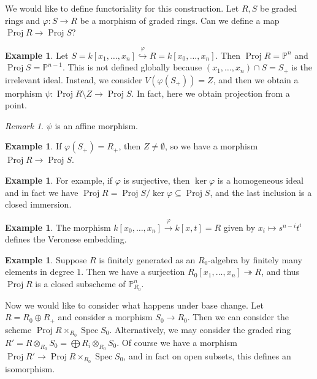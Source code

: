 \documentclass[leqno, openany]{memoir}
\theoremstyle{definition}
\newtheorem{exm}[thm]{Example}
\theoremstyle{remark}
\newtheorem{rmk}[thm]{Remark}
\theoremstyle{plain}
\theoremstyle{definition}
\theoremstyle{remark}
\renewcommand{\P}{\mathbb{P}}
\DeclareMathOperator{\Spec}{Spec}
\DeclareMathOperator{\Proj}{Proj}
\begin{document}
We would like to define functoriality for this construction. Let $R, S$ be
graded rings and $\varphi \colon S \to R$ be a morphism of graded rings. Can we
define a map $\Proj R \to \Proj S$?

\begin{exm} Let $S = k[x_1, \ldots, x_n] \overset{\varphi}{ \hookrightarrow } R
    = k[x_0, \ldots, x_n]$. Then $\Proj R = \P^n$ and $\Proj S = \P^{n-1}$.
    This is not defined globally because $(x_1, \ldots, x_n) \cap S = S_+$ is
    the irrelevant ideal. Instead, we consider $V(\varphi(S_+)) = Z$, and then
    we obtain a morphism $\psi \colon \Proj R \setminus Z \to \Proj S$. In
    fact, here we obtain projection from a point.  \end{exm}

\begin{rmk} $\psi$ is an affine morphism.  \end{rmk}

\begin{exm} If $\varphi(S_+) = R_+$, then $Z \neq \emptyset$, so we have a
morphism $\Proj R \to \Proj S$.  \end{exm}

\begin{exm} For example, if $\varphi$ is surjective, then $\ker \varphi$ is a
homogeneous ideal and in fact we have $\Proj R = \Proj S/\ker\varphi \subseteq
\Proj S$, and the last inclusion is a closed immersion.  \end{exm}

\begin{exm} The morphism $k[x_0, \ldots, x_n] \xrightarrow{\varphi} k[x,t] = R$
given by  $x_i \mapsto s^{n-i}t^i$ defines the Veronese embedding.  \end{exm}

\begin{exm} Suppose $R$ is finitely generated as an $R_0$-algebra by finitely
many elements in degree $1$. Then we have a surjection $R_0[x_1, \ldots, x_n]
\twoheadrightarrow R$, and thus $\Proj R$ is a closed subscheme of
$\P^n_{R_0}$.  \end{exm}

Now we would like to consider what happens under base change. Let $R = R_0
\oplus R_+$ and consider a morphism $S_0 \to R_0$. Then we can consider the
scheme $\Proj R \times_{R_0} \Spec S_0$. Alternatively, we may consider the
graded ring $R' = R \otimes_{R_0} S_0 = \bigoplus R_i \otimes_{R_0} S_0$. Of
course we have a morphism $\Proj R' \to \Proj R \times_{R_0} \Spec S_0$, and in
fact on open subsets, this defines an isomorphism.
\end{document}
